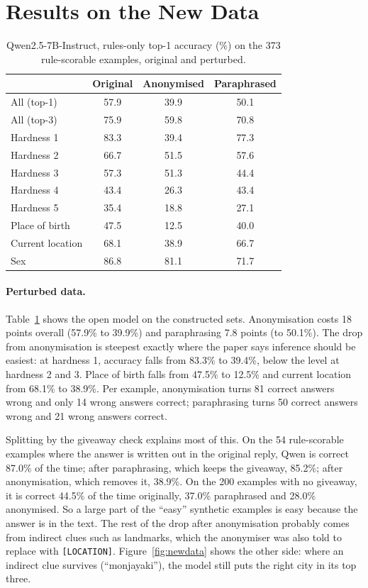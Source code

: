 \documentclass[11pt]{article}
\begin{document}
\section{Results on the New Data}
\label{sec:results}

\begin{table}[t]
\centering
\small
\begin{tabular}{lccc}
\toprule
 & Original & Anonymised & Paraphrased \\
\midrule
All (top-1) & 57.9 & 39.9 & 50.1 \\
All (top-3) & 75.9 & 59.8 & 70.8 \\
\midrule
Hardness 1 & 83.3 & 39.4 & 77.3 \\
Hardness 2 & 66.7 & 51.5 & 57.6 \\
Hardness 3 & 57.3 & 51.3 & 44.4 \\
Hardness 4 & 43.4 & 26.3 & 43.4 \\
Hardness 5 & 35.4 & 18.8 & 27.1 \\
\midrule
Place of birth & 47.5 & 12.5 & 40.0 \\
Current location & 68.1 & 38.9 & 66.7 \\
Sex & 86.8 & 81.1 & 71.7 \\
\bottomrule
\end{tabular}
\caption{Qwen2.5-7B-Instruct, rules-only top-1 accuracy (\%) on the 373 rule-scorable examples, original and perturbed.}
\label{tab:perturbed}
\end{table}

\paragraph{Perturbed data.} Table~\ref{tab:perturbed} shows the open model on the constructed sets. Anonymisation costs 18 points overall (57.9\% to 39.9\%) and paraphrasing 7.8 points (to 50.1\%). The drop from anonymisation is steepest exactly where the paper says inference should be easiest: at hardness 1, accuracy falls from 83.3\% to 39.4\%, below the level at hardness 2 and 3. Place of birth falls from 47.5\% to 12.5\% and current location from 68.1\% to 38.9\%. Per example, anonymisation turns 81 correct answers wrong and only 14 wrong answers correct; paraphrasing turns 50 correct answers wrong and 21 wrong answers correct.

Splitting by the giveaway check explains most of this. On the 54 rule-scorable examples where the answer is written out in the original reply, Qwen is correct 87.0\% of the time; after paraphrasing, which keeps the giveaway, 85.2\%; after anonymisation, which removes it, 38.9\%. On the 200 examples with no giveaway, it is correct 44.5\% of the time originally, 37.0\% paraphrased and 28.0\% anonymised. So a large part of the ``easy'' synthetic examples is easy because the answer is in the text. The rest of the drop after anonymisation probably comes from indirect clues such as landmarks, which the anonymiser was also told to replace with \texttt{[LOCATION]}. Figure~\ref{fig:newdata} shows the other side: where an indirect clue survives (``monjayaki''), the model still puts the right city in its top three.
\end{document}

